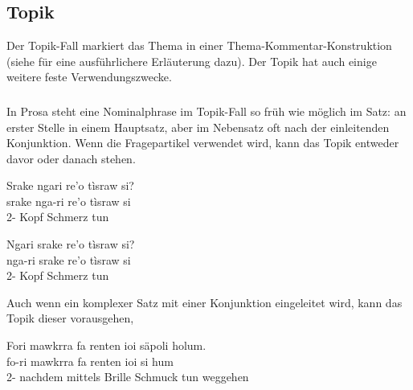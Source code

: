 \subsection{Topik} Der Topik-Fall markiert das Thema in einer Thema-Kommentar-Konstruktion (siehe  für eine ausführlichere Erläuterung dazu).
Der Topik hat auch einige weitere feste Verwendungszwecke.

\subsubsection{} \label{syn!topical!word-order}
In Prosa steht eine Nominalphrase im Topik-Fall so früh wie möglich im Satz: an erster Stelle in einem Hauptsatz, aber im Nebensatz oft nach der einleitenden Konjunktion. Wenn die Fragepartikel  verwendet wird, kann das Topik entweder davor oder danach stehen.

\begin{interlin}
	\glll Srake ngari re'o tìsraw si? \\
	srake nga-ri re'o tìsraw si \\
	 2- Kopf Schmerz tun \\
\end{interlin}

\begin{interlin}
	\glll Ngari srake re'o tìsraw si? \\
	nga-ri srake re'o tìsraw si \\
	2-  Kopf Schmerz tun \\
\end{interlin}

\noindent Auch wenn ein komplexer Satz mit einer Konjunktion eingeleitet wird, kann das Topik dieser vorausgehen,

\begin{interlin}
	\glll Fori mawkrra fa renten ioi säpoli holum. \\
	fo-ri mawkrra fa renten ioi si hum \\
	2- nachdem mittels Brille Schmuck tun weggehen\\
\end{interlin}

